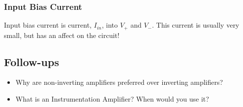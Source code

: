 \documentclass[main.tex]{subfiles}
\begin{document}
\subsubsection{Input Bias Current}
Input bias current is current, $I_{in}$, into $V_{+}$ and $V_{-}$. This current is usually very small, but has an affect on the circuit! 

\subsection{Follow-ups}
\begin{itemize}
    \item Why are non-inverting amplifiers preferred over inverting amplifiers? %
    \item What is an Instrumentation Amplifier? When would you use it? %
\end{itemize}
\end{document}
